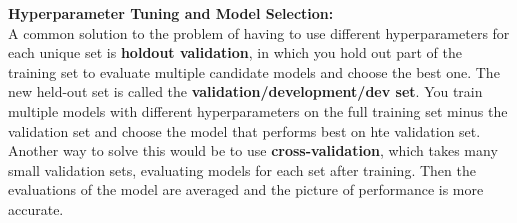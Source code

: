     \noindent \textbf{Hyperparameter Tuning and Model Selection:} \\
    A common solution to the problem of having to use different hyperparameters for each unique set is
    \textbf{holdout validation}, in which you hold out part of the training set to evaluate multiple candidate
    models and choose the best one. The new held-out set is called the \textbf{validation/development/dev set}.
    You train multiple models with different hyperparameters on the full training set minus the validation set
    and choose the model that performs best on hte validation set. Another way to solve this would be to use
    \textbf{cross-validation}, which takes many small validation sets, evaluating models for each set after
    training. Then the evaluations of the model are averaged and the picture of performance is more accurate.




